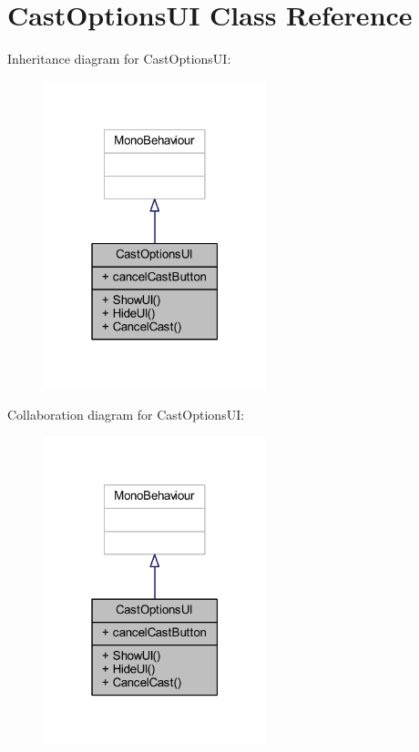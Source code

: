 \hypertarget{class_cast_options_u_i}{}\section{Cast\+Options\+UI Class Reference}
\label{class_cast_options_u_i}


Inheritance diagram for Cast\+Options\+UI\+:\nopagebreak
\begin{figure}[H]
\begin{center}
\leavevmode
\includegraphics[width=183pt]{class_cast_options_u_i__inherit__graph}
\end{center}
\end{figure}


Collaboration diagram for Cast\+Options\+UI\+:\nopagebreak
\begin{figure}[H]
\begin{center}
\leavevmode
\includegraphics[width=183pt]{class_cast_options_u_i__coll__graph}
\end{center}
\end{figure}
